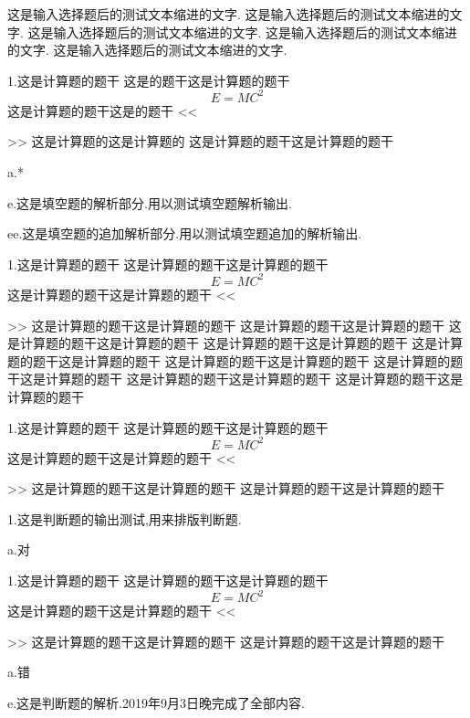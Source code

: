 \documentclass[a4paper,fontset = windowsnew]{ctexart}
\begin{document}
这是输入选择题后的测试文本缩进的文字.
这是输入选择题后的测试文本缩进的文字.
这是输入选择题后的测试文本缩进的文字.
这是输入选择题后的测试文本缩进的文字.
这是输入选择题后的测试文本缩进的文字.
\newpage
\begin{blanks}
1.这是计算题的题干
这是的题干这是计算题的题干
\begin{equation}
  E=MC^2
\end{equation}
这是计算题的题干这是的题干
<<
>>
这是计算题的这是计算题的
这是计算题的题干这是计算题的题干

a.*

e.这是填空题的解析部分.用以测试填空题解析输出.

ee.这是填空题的追加解析部分.用以测试填空题追加的解析输出.

1.这是计算题的题干
这是计算题的题干这是计算题的题干
\begin{equation}
  E=MC^2
\end{equation}
这是计算题的题干这是计算题的题干
<<
>>
这是计算题的题干这是计算题的题干
这是计算题的题干这是计算题的题干
这是计算题的题干这是计算题的题干
这是计算题的题干这是计算题的题干
这是计算题的题干这是计算题的题干
这是计算题的题干这是计算题的题干
这是计算题的题干这是计算题的题干
这是计算题的题干这是计算题的题干
这是计算题的题干这是计算题的题干
  
1.这是计算题的题干
这是计算题的题干这是计算题的题干
\begin{equation}
  E=MC^2
\end{equation}
这是计算题的题干这是计算题的题干
<<
>>
这是计算题的题干这是计算题的题干
这是计算题的题干这是计算题的题干

\end{blanks}


\newpage

\begin{judgements}
  1.这是判断题的输出测试,用来排版判断题.

  a.对

1.这是计算题的题干
这是计算题的题干这是计算题的题干
\begin{equation}
  E=MC^2
\end{equation}
这是计算题的题干这是计算题的题干
<<
>>
这是计算题的题干这是计算题的题干
这是计算题的题干这是计算题的题干

a.错

e.这是判断题的解析.2019年9月3日晚完成了全部内容.

\end{judgements}
\end{document}
